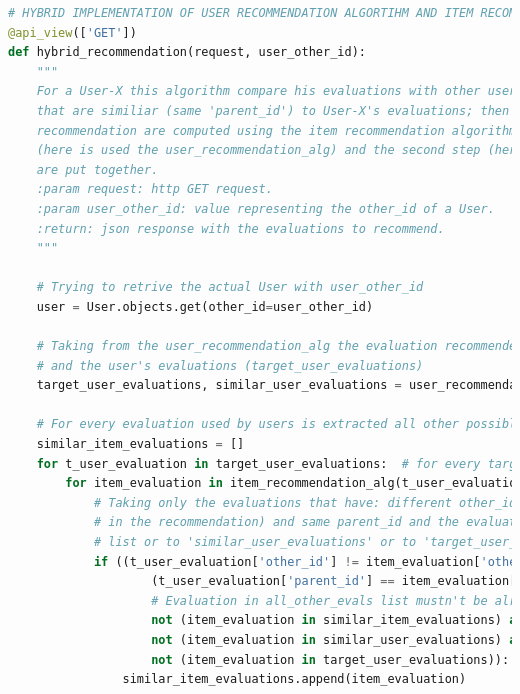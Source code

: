 \begin{lstlisting}[language=Python, caption={Implementazione di un sistema raccomandazione ibrido
	che metta insieme le Raccomandazioni generate dagli algoritmi Item-based e User-based per le Evaluation presenti in Moon Cloud.}]
# HYBRID IMPLEMENTATION OF USER RECOMMENDATION ALGORTIHM AND ITEM RECOMMENDATION ALGORITHM
@api_view(['GET'])
def hybrid_recommendation(request, user_other_id):
	"""
	For a User-X this algorithm compare his evaluations with other users's evaluations and return all the evaluations
	that are similiar (same 'parent_id') to User-X's evaluations; then from all the evaluations used by the User-X other
	recommendation are computed using the item recommendation algorithm; and all the recommendations from the first step
	(here is used the user_recommendation_alg) and the second step (here is used the item_recommendation_alg)
	are put together.
	:param request: http GET request.
	:param user_other_id: value representing the other_id of a User.
	:return: json response with the evaluations to recommend.
	"""

	# Trying to retrive the actual User with user_other_id
	user = User.objects.get(other_id=user_other_id)

	# Taking from the user_recommendation_alg the evaluation recommended from this approach (similar_user_evaluations)
	# and the user's evaluations (target_user_evaluations)
	target_user_evaluations, similar_user_evaluations = user_recommendation_alg(user_other_id)

	# For every evaluation used by users is extracted all other possible evaluations that have the same 'parent_id'
	similar_item_evaluations = []
	for t_user_evaluation in target_user_evaluations:  # for every target user's evaluations
		for item_evaluation in item_recommendation_alg(t_user_evaluation['other_id']):  # is applied the item_recommendation algorithm
			# Taking only the evaluations that have: different other_id (excluding the target evaluation
			# in the recommendation) and same parent_id and the evaluations that weren't added to 'similar_item_evaluations'
			# list or to 'similar_user_evaluations' or to 'target_user_evaluations'
			if ((t_user_evaluation['other_id'] != item_evaluation['other_id']) and # Evaluations must have different 'id'
					(t_user_evaluation['parent_id'] == item_evaluation['parent_id']) and # Evaluations must have the same 'parent_id'
					# Evaluation in all_other_evals list mustn't be already added to \
					not (item_evaluation in similar_item_evaluations) and # the 'similar_item_evaluations' list,
					not (item_evaluation in similar_user_evaluations) and # the 'similar_user_evaluations' list or
					not (item_evaluation in target_user_evaluations)): # the 'target_user_evaluations' list
				similar_item_evaluations.append(item_evaluation)


\end{lstlisting}
